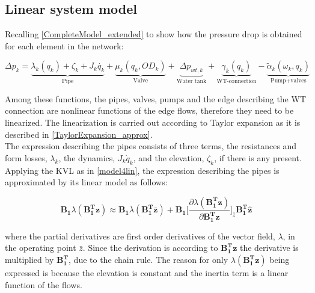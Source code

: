 %
%
%
%

\subsection{Linear system model}
 \label{SystemLin}
 
Recalling \eqref{CompleteModel_extended} to show how the pressure drop is obtained for each element in the network:

\begin{equation}
\label{CompleteModel_extended_2}
\Delta p_k \!= \! \underbrace{\lambda_k (q_k) \!+ \! \zeta_k \!+ \! J_k \dot{q_k}}_\text{Pipe} \!+ \!\underbrace{\mu_k (q_k,OD_k)}_\text{Valve}\! + \!\underbrace{\Delta p_{wt,k}}_\text{Water tank} \!+\! \underbrace{\gamma_k (q_k)}_\text{WT-connection}\! -\! \underbrace{\tilde{\alpha}_k(\omega_k,q_k)}_\text{Pump+valves}
\end{equation}

Among these functions, the pipes, valves, pumps and the edge describing the WT connection are nonlinear functions of the edge flows, therefore they need to be linearized. The linearization is carried out according to Taylor expansion as it is described in \eqref{TaylorExpansion_approx}.
\\
The expression describing the pipes consists of three terms, the resistances and form losses, $\lambda_k$, the dynamics, $J_k\dot{q}_k$, and the elevation, $\zeta_k$, if there is any present. 
\\
Applying the KVL as in \eqref{model4lin}, the expression describing the pipes is approximated by its linear model as follows:

\begin{equation}
  \bm{B_1} \lambda(\bm{{B_1^{T}}}\bm{z}) \approx  \bm{B_1} \lambda(\bm{B_1^T \bar{ z}}) + \bm{B_1} \bigg[ \frac{\partial{\lambda(\bm{{B_1^{T}}}\bm{z})}}{{\partial{\bm{{B_1^{T}}}\bm{z}}}}   \bigg]_{\bar{z}} \bm{{B_1^{T}}}\bm{\hat{z}}
\label{lambda_lin}
\end{equation}

where the partial derivatives are first order derivatives of the vector field, $\lambda$, in the operating point $\bar{z}$. Since the derivation is according to $\bm{{B_1^{T}}}\bm{z}$ the derivative is multiplied by $\bm{{B_1^{T}}}$, due to the chain rule. The reason for only $\lambda(\bm{{B_1^{T}}}\bm{z})$ being expressed is because the elevation is constant and the inertia term is a linear function of the flows. 

